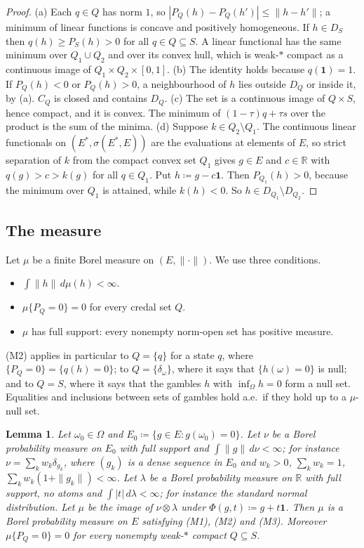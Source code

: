 \documentclass[11pt]{article}
\newcommand{\R}{\mathbb{R}}
\newcommand{\one}{\mathbf{1}}
\theoremstyle{plain}
\newtheorem{lemma}[theorem]{Lemma}
\theoremstyle{definition}
\theoremstyle{remark}
\begin{document}
\begin{proof}
(a) Each $q\in Q$ has norm $1$, so $|P_Q(h)-P_Q(h')|\le\|h-h'\|$; a minimum of linear
functions is concave and positively homogeneous. If $h\in D_S$ then $q(h)\ge P_S(h)>0$
for all $q\in Q\subseteq S$. A linear functional has the same minimum over $Q_1\cup Q_2$
and over its convex hull, which is weak-$\ast$ compact as a continuous image of
$Q_1\times Q_2\times[0,1]$.
(b) The identity holds because $q(\one)=1$. If $P_Q(h)<0$ or $P_Q(h)>0$, a neighbourhood
of $h$ lies outside $D_Q$ or inside it, by (a). $C_Q$ is closed and contains $D_Q$.
(c) The set is a continuous image of $Q\times S$, hence compact, and it is convex. The
minimum of $(1-\tau)q+\tau s$ over the product is the sum of the minima.
(d) Suppose $k\in Q_2\setminus Q_1$. The continuous linear functionals on $(E^\ast,
\sigma(E^\ast,E))$ are the evaluations at elements of $E$, so strict separation of $k$
from the compact convex set $Q_1$ gives $g\in E$ and $c\in\R$ with $q(g)>c>k(g)$ for all
$q\in Q_1$. Put $h\coloneqq g-c\one$. Then $P_{Q_1}(h)>0$, because the minimum over $Q_1$
is attained, while $k(h)<0$. So $h\in D_{Q_1}\setminus D_{Q_2}$.
\end{proof}

\subsection{The measure}

Let $\mu$ be a finite Borel measure on $(E,\|\cdot\|)$. We use three conditions.
\begin{itemize}
  \item[(M1)] $\int\|h\|\,d\mu(h)<\infty$.
  \item[(M2)] $\mu\{P_Q=0\}=0$ for every credal set $Q$.
  \item[(M3)] $\mu$ has full support: every nonempty norm-open set has positive measure.
\end{itemize}
(M2) applies in particular to $Q=\{q\}$ for a state $q$, where $\{P_Q=0\}=\{q(h)=0\}$; to
$Q=\{\delta_\omega\}$, where it says that $\{h(\omega)=0\}$ is null; and to $Q=S$, where
it says that the gambles $h$ with $\inf_\Omega h=0$ form a null set. Equalities and
inclusions between sets of gambles hold a.e.\ if they hold up to a $\mu$-null set.

\begin{lemma}\label{lem:measure}
Let $\omega_0\in\Omega$ and $E_0\coloneqq\{g\in E:g(\omega_0)=0\}$. Let $\nu$ be a Borel
probability measure on $E_0$ with full support and $\int\|g\|\,d\nu<\infty$; for instance
$\nu=\sum_kw_k\delta_{g_k}$, where $(g_k)$ is a dense sequence in $E_0$ and $w_k>0$,
$\sum_kw_k=1$, $\sum_kw_k(1+\|g_k\|)<\infty$. Let $\lambda$ be a Borel probability measure
on $\R$ with full support, no atoms and $\int|t|\,d\lambda<\infty$; for instance the
standard normal distribution. Let $\mu$ be the image of $\nu\otimes\lambda$ under
$\Phi(g,t)\coloneqq g+t\one$. Then $\mu$ is a Borel probability measure on $E$ satisfying
(M1), (M2) and (M3). Moreover $\mu\{P_Q=0\}=0$ for every nonempty weak-$\ast$ compact
$Q\subseteq S$.
\end{lemma}
\end{document}
